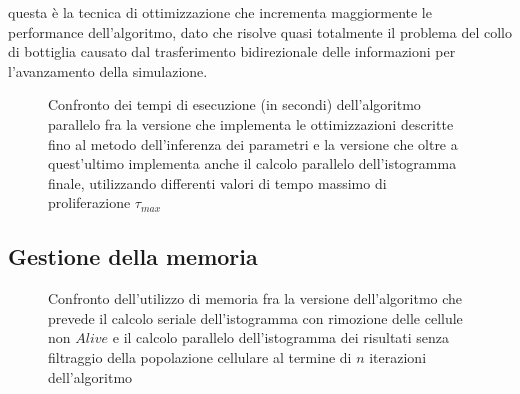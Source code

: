questa è la tecnica di ottimizzazione che incrementa maggiormente
le performance dell'algoritmo, dato che risolve quasi totalmente il problema
del collo di bottiglia causato dal trasferimento bidirezionale delle informazioni
per l'avanzamento della simulazione.
\begin{figure}[t]
    \centering
    \caption{Confronto dei tempi di esecuzione (in secondi) dell'algoritmo
    parallelo fra la versione che implementa le ottimizzazioni descritte fino al
    metodo dell'inferenza dei parametri
    e la versione che oltre a quest'ultimo implementa anche il calcolo parallelo
    dell'istogramma finale,
    utilizzando differenti valori di tempo massimo di proliferazione
    $\tau_{max}$}
    \label{chart:inference-histogram}
\end{figure}

\subsection{Gestione della memoria}

\begin{figure}[h]
    \centering
    \caption{Confronto dell'utilizzo di memoria fra la versione dell'algoritmo
        che prevede il calcolo seriale dell'istogramma con rimozione delle
        cellule non $Alive$ e il calcolo parallelo dell'istogramma dei risultati
        senza filtraggio della popolazione cellulare al termine di $n$ iterazioni
        dell'algoritmo}
    \label{chart:serial-parallel-histogram} 
\end{figure}

